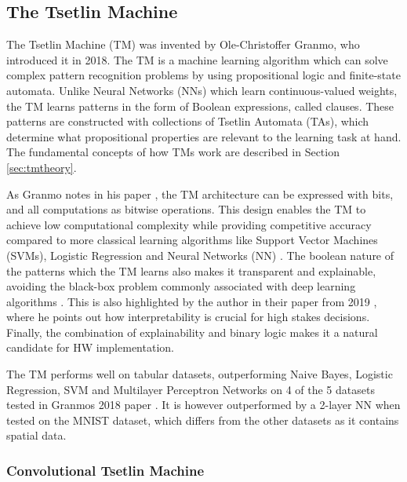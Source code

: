 

\subsection{The Tsetlin Machine}
\label{seq:tmbackground}
The Tsetlin Machine (TM) was invented by Ole-Christoffer Granmo, who introduced it in 2018\cite{GranmoOle-Christoffer2018TTM-}. The TM is a machine learning algorithm which can solve complex pattern recognition problems by using propositional logic and finite-state automata. Unlike Neural Networks (NNs) which learn continuous-valued weights, the TM learns patterns in the form of Boolean expressions, called clauses. These patterns are constructed with collections of Tsetlin Automata (TAs)\cite{Tsetlin1961}, which determine what propositional properties are relevant to the learning task at hand. The fundamental concepts of how TMs work are described in Section \ref{sec:tmtheory}.

As Granmo notes in his paper \cite{GranmoOle-Christoffer2018TTM-}, the TM architecture can be expressed with bits, and all computations as bitwise operations. This design enables the TM to achieve low computational complexity while providing competitive accuracy compared to more classical learning algorithms like Support Vector Machines (SVMs), Logistic Regression and Neural Networks (NN) \cite{GranmoOle-Christoffer2018TTM-}. The boolean nature of the patterns
which the TM learns also makes it transparent and explainable, avoiding the black-box problem commonly associated with deep learning algorithms \cite{RudinCynthia2019Sebb}. This is also highlighted by the author in their paper from 2019 \cite{GranmoOle-Christoffer2019TCTM}, where he points out how interpretability is crucial for high stakes decisions. Finally, the combination of explainability and binary logic makes it a natural candidate for HW implementation.

The TM performs well on tabular datasets, outperforming Naive Bayes, Logistic Regression, SVM and Multilayer Perceptron Networks on 4 of the 5 datasets tested in Granmos 2018 paper \cite{GranmoOle-Christoffer2018TTM-}. It is however outperformed by a 2-layer NN when tested on the MNIST dataset, which differs from the other datasets as it contains spatial data.

\subsubsection{Convolutional Tsetlin Machine}

